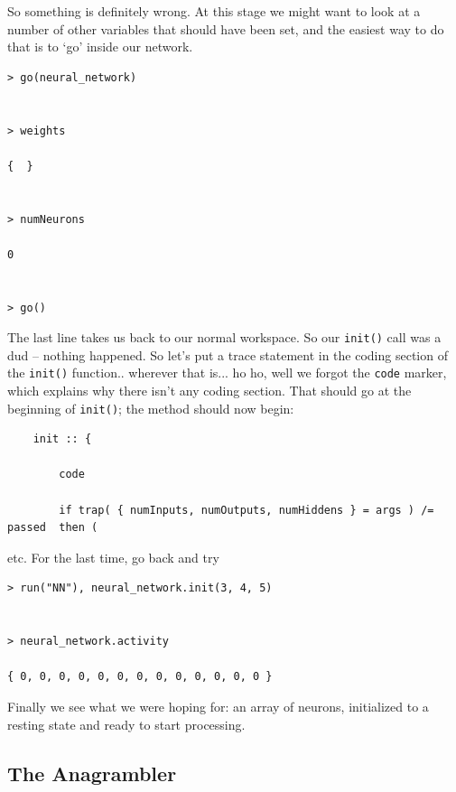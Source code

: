 \documentclass{article}
\newenvironment{code}{
       \begin{list}{}{
               \setlength{\leftmargin}{.4in}
               \setlength{\rightmargin}{0in}
               \setlength{\topsep}{.2in}
       }
       \small
       \item[] }
       { \end{list}   }
\begin{document}
\noindent So something is definitely wrong.  At this stage we might want to look at a number of other variables that should have been set, and the easiest way to do that is to `go' inside our network.

\begin{code} \begin{verbatim}
> go(neural_network)


> weights

{  }


> numNeurons

0


> go()
\end{verbatim} \end{code}

\noindent The last line takes us back to our normal workspace.  So our \verb#init()# call was a dud -- nothing happened.  So let's put a trace statement in the coding section of the \verb#init()# function.. wherever that is...  ho ho, well we forgot the \verb#code# marker, which explains why there isn't any coding section.  That should go at the beginning of \verb#init()#; the method should now begin:

\begin{code} \begin{verbatim}
    init :: {
        
        code
        
        if trap( { numInputs, numOutputs, numHiddens } = args ) /= passed  then (
\end{verbatim} \end{code}

etc.  For the last time, go back and try

\begin{code} \begin{verbatim}
> run("NN"), neural_network.init(3, 4, 5)


> neural_network.activity

{ 0, 0, 0, 0, 0, 0, 0, 0, 0, 0, 0, 0, 0 }
\end{verbatim} \end{code}

\noindent Finally we see what we were hoping for:  an array of neurons, initialized to a resting state and ready to start processing.



\subsection{The Anagrambler}
\end{document}
